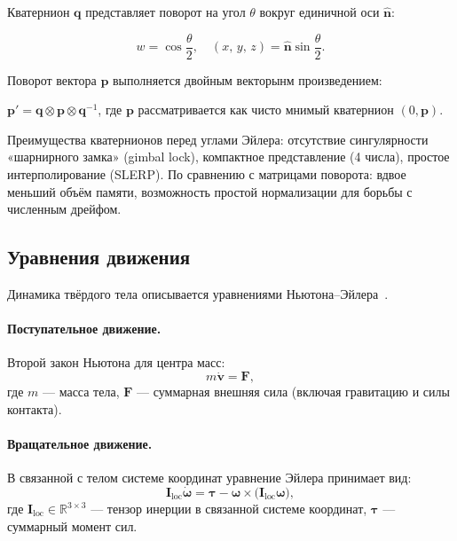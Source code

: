 Кватернион $\mathbf{q}$ представляет поворот на угол $\theta$ вокруг единичной оси $\hat{\mathbf{n}}$:

\begin{equation}
  w = \cos\frac{\theta}{2}, \quad (x,\, y,\, z) = \hat{\mathbf{n}}\sin\frac{\theta}{2}.
\end{equation}

Поворот вектора $\mathbf{p}$ выполняется двойным векторынм произведением:

$\mathbf{p}' = \mathbf{q} \otimes \mathbf{p} \otimes \mathbf{q}^{-1}$,
где $\mathbf{p}$ рассматривается как чисто мнимый кватернион $(0, \mathbf{p})$.

Преимущества кватернионов перед углами Эйлера: отсутствие сингулярности «шарнирного замка» (gimbal lock), 
компактное представление (4 числа), простое интерполирование (SLERP). По сравнению с матрицами поворота: вдвое 
меньший объём памяти, возможность простой нормализации для борьбы с численным дрейфом.

\subsection{Уравнения движения}

Динамика твёрдого тела описывается уравнениями Ньютона–Эйлера~\cite{featherstone2008rigid}.

\paragraph{Поступательное движение.}
Второй закон Ньютона для центра масс:
\begin{equation}
  m\dot{\mathbf{v}} = \mathbf{F},
  \label{eq:newton}
\end{equation}
где $m$ — масса тела, $\mathbf{F}$ --- суммарная внешняя сила (включая гравитацию и силы контакта).

\paragraph{Вращательное движение.}
В связанной с телом системе координат уравнение Эйлера принимает вид:
\begin{equation}
  \mathbf{I}_{\text{loc}}\dot{\boldsymbol{\omega}} = \boldsymbol{\tau} - \boldsymbol{\omega} \times \bigl(\mathbf{I}_{\text{loc}}\boldsymbol{\omega}\bigr),
  \label{eq:euler-rot}
\end{equation}
где $\mathbf{I}_{\text{loc}} \in \mathbb{R}^{3 \times 3}$ --- тензор инерции в связанной системе координат,
$\boldsymbol{\tau}$ --- суммарный момент сил.

